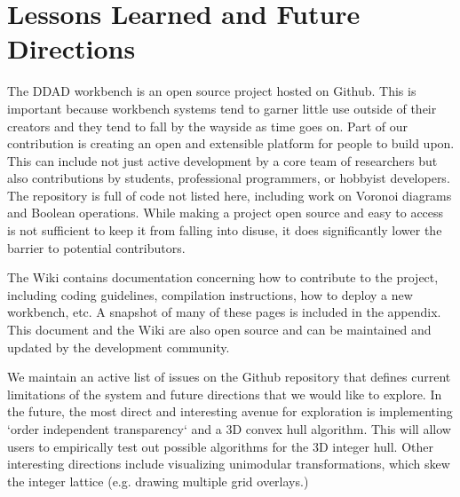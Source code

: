 \FloatBarrier
\section{Lessons Learned and Future Directions} 
\label{sec:lessons-learned}

The DDAD workbench is an open source project hosted on Github. This is important
because workbench systems tend to garner little use outside of their creators
and they tend to fall by the wayside as time goes on. Part of our contribution
is creating an open and extensible platform for people to build upon. This can
include not just active development by a core team of researchers but also
contributions by students, professional programmers, or hobbyist developers. The
repository is full of code not listed here, including work on Voronoi diagrams
and Boolean operations. While making a project open source and easy to access is
not sufficient to keep it from falling into disuse, it does significantly lower
the barrier to potential contributors.

The Wiki contains documentation concerning how to contribute to the project,
including coding guidelines, compilation instructions, how to deploy
a new workbench, etc. A snapshot of many of these pages is included in the
appendix. This document and the Wiki are also open source and can be maintained
and updated by the development community.

We maintain an active list of issues on the Github repository that defines
current limitations of the system and future directions that we would like to
explore. In the future, the most direct and interesting avenue for exploration
is implementing `order independent transparency` and a 3D convex hull algorithm.
This will allow users to empirically test out possible algorithms for the 3D
integer hull. Other interesting directions include visualizing unimodular
transformations, which skew the integer lattice (e.g. drawing multiple grid
overlays.)


% 	
